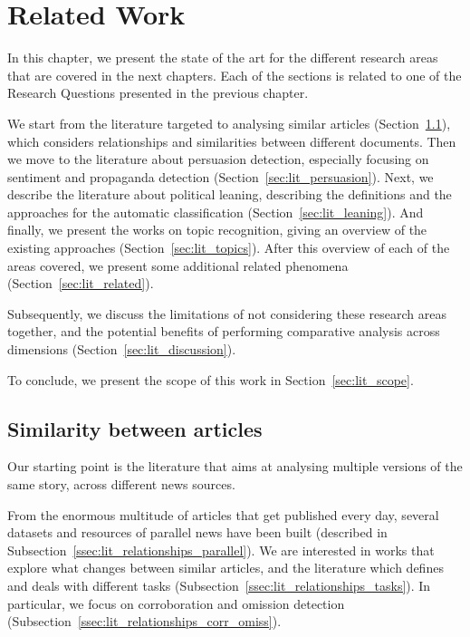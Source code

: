 \chapter{\statusgreen Related Work}
\label{chap:literature}

In this chapter, we present the state of the art for the different research areas that are covered in the next chapters. Each of the sections is related to one of the Research Questions presented in the previous chapter.

We start from the literature targeted to analysing similar articles (Section~\ref{sec:lit_relationships}), which considers relationships and similarities between different documents.
Then we move to the literature about persuasion detection, especially focusing on sentiment and propaganda detection (Section~\ref{sec:lit_persuasion}).
Next, we describe the literature about political leaning, describing the definitions and the approaches for the automatic classification (Section~\ref{sec:lit_leaning}).
And finally, we present the works on topic recognition, giving an overview of the existing approaches (Section~\ref{sec:lit_topics}).
After this overview of each of the areas covered, we present some additional related phenomena (Section~\ref{sec:lit_related}).

Subsequently, we discuss the limitations of not considering these research areas together, and the potential benefits of performing comparative analysis across dimensions (Section~\ref{sec:lit_discussion}).

To conclude, we present the scope of this work in Section~\ref{sec:lit_scope}.







\section{\statusgreen Similarity between articles}
\label{sec:lit_relationships}

Our starting point is the literature that aims at analysing multiple versions of the same story, across different news sources.

From the enormous multitude of articles that get published every day, several datasets and resources of parallel news have been built (described in Subsection~\ref{ssec:lit_relationships_parallel}).
We are interested in works that explore what changes between similar articles, and the literature which defines and deals with different tasks (Subsection~\ref{ssec:lit_relationships_tasks}). In particular, we focus on corroboration and omission detection (Subsection~\ref{ssec:lit_relationships_corr_omiss}).


